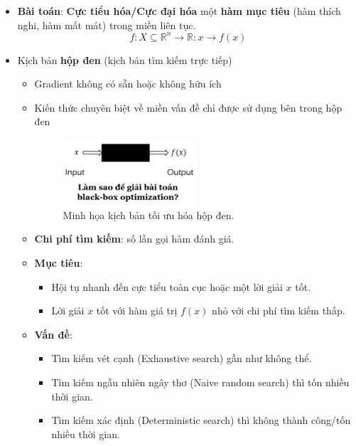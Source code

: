 \documentclass{book}
\begin{document}
\begin{itemize}
    \item \textbf{Bài toán}: \textbf{Cực tiểu hóa/Cực đại hóa} một \textbf{hàm mục tiêu} (hàm thích nghi, hàm mất mát) trong miền liên tục.
    \begin{equation*}
        f: X \subseteq \mathbb{R}^n \to \mathbb{R}: x\to f(x)
    \end{equation*}
    \item Kịch bản \textbf{hộp đen} (kịch bản tìm kiếm trực tiếp)
    \begin{itemize}
        \item Gradient không có sẵn hoặc không hữu ích
        \item Kiến thức chuyên biệt về miền vấn đề chỉ được sử dụng bên trong hộp đen
        \begin{figure}[H]
            \centering
            \includegraphics[width=0.5\textwidth]{images/blackbox.png}
            \caption{Minh họa kịch bản tối ưu hóa hộp đen.}
            \label{fig:blackbox-ea}
        \end{figure}
        \item \textbf{Chi phí tìm kiếm}: số lần gọi hàm đánh giá.
        \item \textbf{Mục tiêu}:
        \begin{itemize}
            \item Hội tụ nhanh đến cực tiểu toàn cục hoặc một lời giải $x$ tốt.
            \item Lời giải $x$ tốt với hàm giá trị $f(x)$ nhỏ với chi phí tìm kiếm thấp.
        \end{itemize}
        \item \textbf{Vấn đề}:
        \begin{itemize}
            \item Tìm kiếm vét cạnh (Exhaustive search) gần như không thể.
            \item Tìm kiếm ngẫu nhiên ngây thơ (Naive random search) thì tốn nhiều thời gian.
            \item Tìm kiếm xác định (Deterministic search) thì không thành công/tốn nhiều thời gian.
        \end{itemize}

\end{itemize}
\end{itemize}
\end{document}

